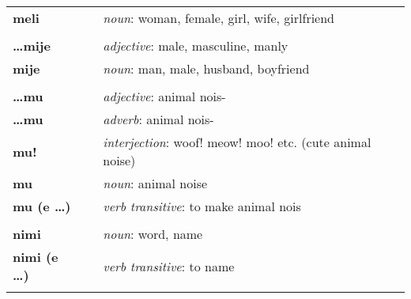 \begin{supertabular}{p{2,5cm}|ll}
    \textbf{meli}            &  & \textit{noun}: woman, female, girl, wife, girlfriend                                         \\ %
                             &  &                                                                                              \\ %
    \textbf{\dots mije}      &  & \textit{adjective}: male, masculine, manly                                                   \\ %
    \textbf{mije}            &  & \textit{noun}: man, male, husband, boyfriend                                                 \\ %
                             &  &                                                                                              \\ %
    \textbf{\dots mu}        &  & \textit{adjective}: animal nois-                                                             \\ %
    \textbf{\dots mu}        &  & \textit{adverb}: animal nois-                                                                \\ %
    \textbf{mu!}             &  & \textit{interjection}: woof! meow! moo! etc. (cute animal noise)                             \\ %
    \textbf{mu}              &  & \textit{noun}: animal noise                                                                  \\ %
    \textbf{mu (e \dots)}    &  & \textit{verb transitive}: to make animal nois                                                \\ %
                             &  &                                                                                              \\ %
    \textbf{nimi}            &  & \textit{noun}: word, name                                                                    \\ %
    \textbf{nimi (e \dots )} &  & \textit{verb transitive}: to name                                                            \\ %
                             &  &                                                                                              \\ %

\end{supertabular}
